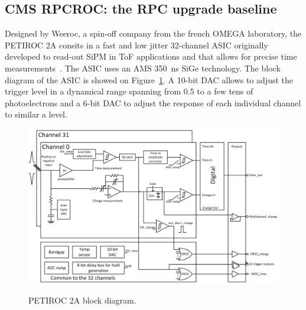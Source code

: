 	\subsection{CMS RPCROC: the RPC upgrade baseline}
	\label{chapt6:ssec:RPCROC}
	
	Designed by Weeroc, a spin-off company from the french OMEGA laboratory, the PETIROC 2A consits in a fast and low jitter 32-channel ASIC originally developed to read-out \acf{SiPM} in ToF applications and that allows for precise time measurements~\cite{PETIROCIEEE,PETIROCTWEPP}. The ASIC uses an AMS \SI{350}{ns} SiGe technology. The block diagram of the ASIC is showed on Figure~\ref{fig:PETIROCASIC}. A 10-bit DAC allows to adjust the trigger level in a dynamical range spanning from 0.5 to a few tens of photoelectrons and a 6-bit DAC to adjust the response of each individual channel to similar a level.
	
	\begin{figure}[H]
		\centering
		\includegraphics[width = \linewidth]{fig/chapt6/petiroc2.png}\\
		\caption{\label{fig:PETIROCASIC} PETIROC 2A block diagram.}
	\end{figure}
	
